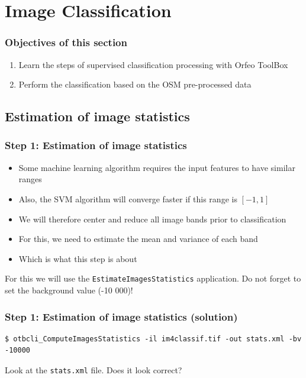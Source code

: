 \documentclass[8pt]{beamer}
\begin{document}
\section{Image Classification}

\begin{frame}
\frametitle{Objectives of this section}

\begin{enumerate}
\item Learn the steps of supervised classification processing with Orfeo ToolBox
\item Perform the classification based on the OSM pre-processed data
\end{enumerate}

\end{frame}

\subsection{Estimation of image statistics}

\begin{frame}
\frametitle{Step 1: Estimation of image statistics}

\begin{itemize}
\item Some machine learning algorithm requires the input features to have similar ranges
\item Also, the SVM algorithm will converge faster if this range is $[-1,1]$
\item We will therefore center and reduce all image bands prior to classification
\item For this, we need to estimate the mean and variance of each band
\item Which is what this step is about
\end{itemize}

For this we will use the \texttt{EstimateImagesStatistics} application. Do not forget to set the background value (-10 000)!

\end{frame}

\begin{frame}[fragile]
\frametitle{Step 1: Estimation of image statistics (solution)}

\begin{scriptsize}
\begin{verbatim}
$ otbcli_ComputeImagesStatistics -il im4classif.tif -out stats.xml -bv -10000
\end{verbatim}
\end{scriptsize}

Look  at the \texttt{stats.xml} file. Does it look correct?

\end{frame}
\end{document}
